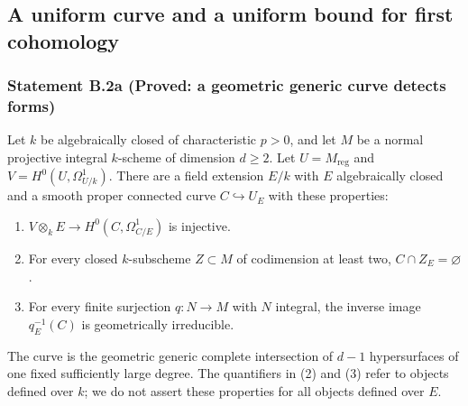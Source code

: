 \subsection{A uniform curve and a uniform bound for first cohomology}

\subsubsection*{Statement B.2a (Proved: a geometric generic curve detects forms)}
Let $k$ be algebraically closed of characteristic $p>0$, and let
$M$ be a normal projective integral $k$-scheme of dimension $d\geq2$.
Let $U=M_{\mathrm{reg}}$ and
$V=H^0(U,\Omega^1_{U/k})$.  There are a field extension $E/k$ with
$E$ algebraically closed and a smooth proper connected curve
$C\hookrightarrow U_E$ with these properties:
\begin{enumerate}
\item $V\otimes_kE\to H^0(C,\Omega^1_{C/E})$ is injective.
\item For every closed $k$-subscheme $Z\subset M$ of codimension at
least two, $C\cap Z_E=\varnothing$.
\item For every finite surjection $q:N\to M$ with $N$ integral,
the inverse image $q_E^{-1}(C)$ is geometrically irreducible.
\end{enumerate}
The curve is the geometric generic complete intersection of
$d-1$ hypersurfaces of one fixed sufficiently large degree.
The quantifiers in (2) and (3) refer to objects defined over $k$;
we do not assert these properties for all objects defined over $E$.
